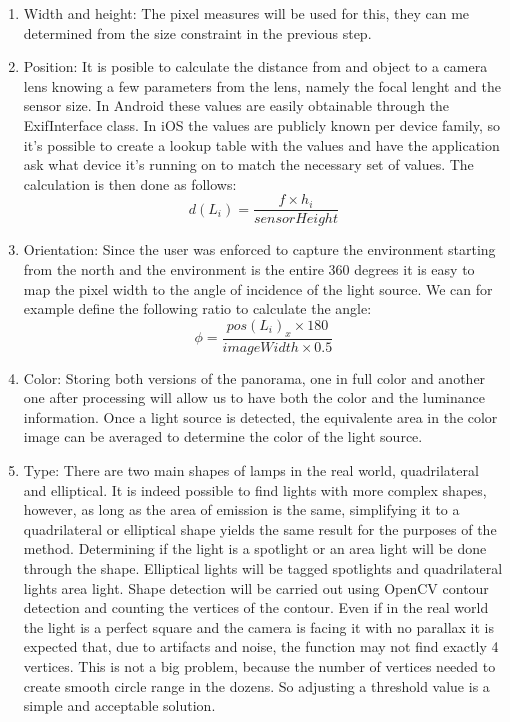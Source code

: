 \begin{enumerate}
\item Width and height: The pixel measures will be used for this, they can me determined from the size constraint in the previous step.
\item Position: It is posible to calculate the distance from and object to a camera lens knowing a few parameters from the lens, namely the focal lenght and the sensor size. In Android these values are easily obtainable through the ExifInterface class. In iOS the values are publicly known per device family, so it's possible to create a lookup table with the values and have the application ask what device it's running on to match the necessary set of values. The calculation is then done as follows:
\[
    d(L_i) = \frac{ f \times h_i}{sensorHeight}
\]
\item  Orientation: Since the user was enforced to capture the environment starting from the north and the environment is the entire 360 degrees it is easy to map the pixel width to the angle of incidence of the light source. We can for example define the following ratio to calculate the angle:
\[
    \phi = \frac{pos(L_i)_x \times 180}{imageWidth \times 0.5}
\]
\item Color: Storing both versions of the panorama, one in full color and another one after processing will allow us to have both the color and the luminance information. Once a light source is detected, the equivalente area in the color image can be averaged to determine the color of the light source.
\item Type: There are two main shapes of lamps in the real world, quadrilateral and elliptical. It is indeed possible to find lights with more complex shapes, however, as long as the area of emission is the same, simplifying it to a quadrilateral or elliptical shape yields the same result for the purposes of the method.
\newline 
Determining if the light is a spotlight or an area light will be done through the shape. Elliptical lights will be tagged spotlights and quadrilateral lights area light. Shape detection will be carried out using OpenCV contour detection and counting the vertices of the contour. Even if in the real world the light is a perfect square and the camera is facing it with no parallax it is expected that,  due to artifacts and noise, the function may not find exactly 4 vertices. This is not a big problem, because the number of vertices needed to create smooth circle range in the dozens. So adjusting a threshold value is a simple and acceptable solution.
\end{enumerate}

